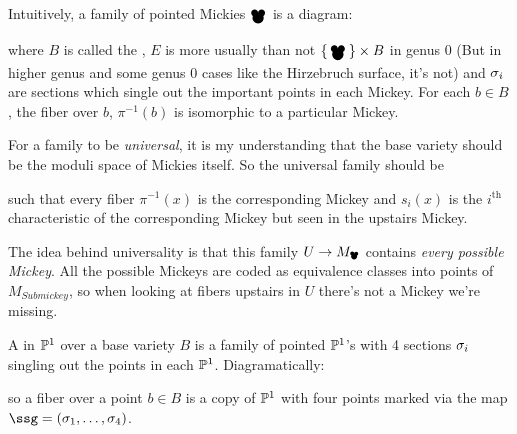 \documentclass[12pt]{memoir}
\newcommand{\Mickey}{\pre{\raisebox{-1mm}{\scalebox{1.3}{\ensuremath\bullet}}}\hspace{-1.8 mm}{\raisebox{-1.65mm}{\scalebox{2.1}{\ensuremath\bullet}}}^{\hspace{-2.1mm}\raisebox{-1mm}{\scalebox{1.3}{\ensuremath\bullet}}}}
\newcommand{\Submickey}{\pre{\scalebox{0.75}{\ensuremath\bullet}}\hspace{-0.9mm}{\raisebox{-0.35mm}{\scalebox{1.1}{\ensuremath\bullet}}}^{\hspace{-1.1mm}\raisebox{-0.1mm}{\scalebox{0.75}{\ensuremath\bullet}}}}
\begin{document}
Intuitively, a family of pointed Mickies $\Mickey$ is a diagram:
\begin{figure}[h!]
    \centering
{}
    \label{fig-example-family-diagram}
\end{figure}
where $B$ is called the , $E$ is more usually than not $\set{\Mickey}\x B$ in genus 0 (But in higher genus and some genus 0 cases like the Hirzebruch surface, it's not) and $\sigma_i$ are sections which single out the important points in each Mickey. For each $b\in B$, the fiber over $b$, $\pi^{-1}(b)$ is isomorphic to a particular Mickey.\par 
For a family to be \emph{universal}, it is my understanding that the base variety should be the moduli space of Mickies itself. So the universal family should be 

\begin{figure}[h!]
    \centering
{}
    \label{fig-example-universal-family-diagram}
\end{figure}

such that every fiber $\pi^{-1}(x)$ is the corresponding Mickey and $s_i(x)$ is the $i^{\text{th}}$ characteristic of the corresponding Mickey but seen in the upstairs Mickey.

\begin{Rmk}\label{rmk-intuition-universal-family}
    The idea behind universality is that this family $U\to M_{\Submickey}$ contains \emph{every possible Mickey}. All the possible Mickeys are coded as equivalence classes into points of $M_{Submickey}$, so when looking at fibers upstairs in $U$ there's not a Mickey we're missing.
\end{Rmk}

\begin{Def}
    A  in $\mathbb{P}^1$ over a base variety $B$ is a family of pointed $\mathbb{P}^1$'s with 4 sections $\sigma_i$ singling out the points in each $\mathbb{P}^1$. Diagramatically: 
    \begin{center}
    \end{center}
    so a fiber over a point $b\in B$ is a copy of $\mathbb{P}^1$ with four points marked via the map $\ssg=(\sg_1,\dots,\sg_4)$.
\end{Def}
\end{document}
